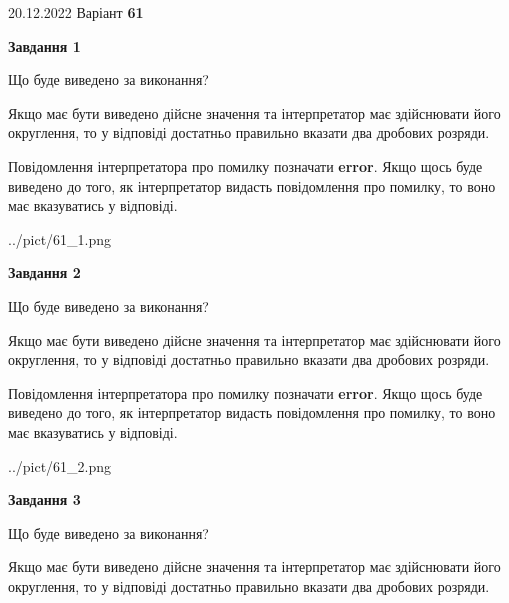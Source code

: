 \documentclass[12pt, ukrainian]{article}
\begin{document}
{20.12.2022 Варіант \No \textbf { 61 }\par}
{
\begin {Large}

{\begin {center}\textbf{Завдання 1}\end {center}}\par
Що буде виведено за виконання? \par

Якщо має бути виведено дійсне значення та інтерпретатор має здійснювати його округлення, 
то у відповіді достатньо правильно вказати два дробових розряди.

Повідомлення інтерпретатора про помилку позначати \textbf{error}.
Якщо щось буде виведено до того, як інтерпретатор видасть повідомлення про помилку, 
то воно має вказуватись у відповіді. \par

\begin{center}
	{../pict/61_1.png}
\end{center}
\newpage

{\begin {center}\textbf{Завдання 2}\end {center}}\par
Що буде виведено за виконання? \par

Якщо має бути виведено дійсне значення та інтерпретатор має здійснювати його округлення, 
то у відповіді достатньо правильно вказати два дробових розряди.

Повідомлення інтерпретатора про помилку позначати \textbf{error}.
Якщо щось буде виведено до того, як інтерпретатор видасть повідомлення про помилку, 
то воно має вказуватись у відповіді. \par

\begin{center}
	{../pict/61_2.png}
\end{center}
\newpage

{\begin {center}\textbf{Завдання 3}\end {center}}\par
Що буде виведено за виконання? \par

Якщо має бути виведено дійсне значення та інтерпретатор має здійснювати його округлення, 
то у відповіді достатньо правильно вказати два дробових розряди.


\end{Large}}
\end{document}
